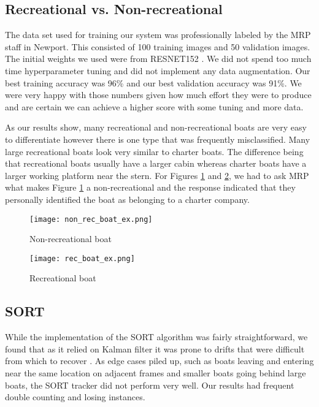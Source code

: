 \documentclass[10pt,twocolumn,letterpaper]{article}
\begin{document}
\subsection{Recreational vs. Non-recreational}

The data set used for training our system was professionally labeled by the MRP staff in Newport. This consisted of 100 training images and 50 validation images. The initial weights we used were from RESNET152 \cite{PyTorch_RESNET152}. We did not spend too much time hyperparameter tuning and did not implement any data augmentation. Our best training accuracy was 96\% and our best validation accuracy was 91\%. We were very happy with those numbers given how much effort they were to produce and are certain we can achieve a higher score with some tuning and more data.

As our results show, many recreational and non-recreational boats are very easy to differentiate however there is one type that was frequently misclassified. Many large recreational boats look very similar to charter boats. The difference being that recreational boats usually have a larger cabin whereas charter boats have a larger working platform near the stern. For Figures \ref{fig:non_rec_boat} and \ref{fig:rec_boat}, we had to ask MRP what makes Figure \ref{fig:non_rec_boat} a non-recreational and the response indicated that they personally identified the boat as belonging to a charter company.

\begin{figure}
 \center
  \texttt{[image: non\_rec\_boat\_ex.png]}
  \caption{Non-recreational boat}
  \label{fig:non_rec_boat}
\end{figure}

\begin{figure}
 \center
  \texttt{[image: rec\_boat\_ex.png]}
  \caption{Recreational boat}
  \label{fig:rec_boat}
\end{figure}

\subsection{SORT}

While the implementation of the SORT algorithm was fairly straightforward, we found that as it relied on Kalman filter it was prone to drifts that were difficult from which to recover \cite{10.1007/978-3-540-24670-1_3}. As edge cases piled up, such as boats leaving and entering near the same location on adjacent frames and smaller boats going behind large boats, the SORT tracker did not perform very well. Our results had frequent double counting and losing instances.
\end{document}

